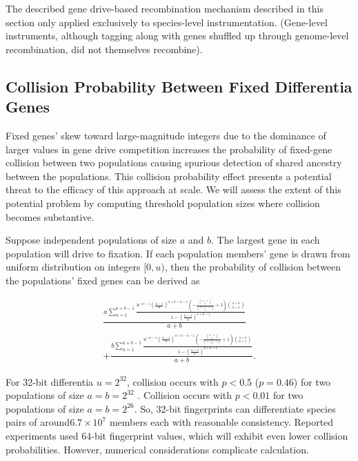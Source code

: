The described gene drive-based recombination mechanism described in this section only applied exclusively to species-level instrumentation.
(Gene-level instruments, although tagging along with genes shuffled up through genome-level recombination, did not themselves recombine).

\subsection{Collision Probability Between Fixed Differentia Genes}
\label{sec:collision-probability}

Fixed genes' skew toward large-magnitude integers due to the dominance of larger values in gene drive competition increases the probability of fixed-gene collision between two populations causing spurious detection of shared ancestry between the populations.
This collision probability effect presents a potential threat to the efficacy of this approach at scale.
We will assess the extent of this potential problem by computing threshold population sizes where collision becomes substantive.

Suppose independent populations of size $a$ and $b$.
The largest gene in each population will drive to fixation.
If each population members' gene is drawn from uniform distribution on integers $[0, u)$, then the probability of collision between the populations' fixed genes can be derived as

\begin{align*}
\frac{a \sum_{n=1}^{a + b - 1} \frac{u^{- n - 1} \left(\frac{u - 1}{u}\right)^{a + b - n - 1} \left(- \frac{{\binom{a - 1}{n}}}{{\binom{a + b - 1}{n}}} + 1\right) {\binom{a + b}{n + 1}}}{1 - \left(\frac{u - 1}{u}\right)^{a + b - 1}}}{a + b} \\
+ \frac{b \sum_{n=1}^{a + b - 1} \frac{u^{- n - 1} \left(\frac{u - 1}{u}\right)^{a + b - n - 1} \left(- \frac{{\binom{b - 1}{n}}}{{\binom{a + b - 1}{n}}} + 1\right) {\binom{a + b}{n + 1}}}{1 - \left(\frac{u - 1}{u}\right)^{a + b - 1}}}{a + b}.
\end{align*}


For 32-bit differentia $u = 2^{32}$, collision occurs with $p < 0.5$ ($p = 0.46$) for two populations of size $a = b = 2^{32}$ .
Collision occurs with $p < 0.01$ for two populations of size $a = b = 2^{26}$.
So, 32-bit fingerprints can differentiate species pairs of around$ 6.7 \times 10^{7}$ members each with reasonable consistency.
Reported experiments used 64-bit fingerprint values, which will exhibit even lower collision probabilities.
However, numerical considerations complicate calculation.

